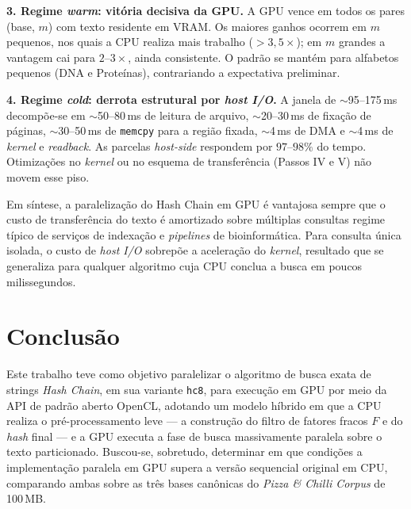 \documentclass[12pt]{article}
\begin{document}
\textbf{3. Regime \textit{warm}: vitória decisiva da GPU.} A GPU vence em todos os pares (base, $m$) com texto residente em VRAM. Os maiores ganhos ocorrem em $m$ pequenos, nos quais a CPU realiza mais trabalho ($>3{,}5\times$); em $m$ grandes a vantagem cai para $2$--$3\times$, ainda consistente. O padrão se mantém para alfabetos pequenos (DNA e Proteínas), contrariando a expectativa preliminar.

\textbf{4. Regime \textit{cold}: derrota estrutural por \textit{host I/O}.} A janela de $\sim$95--175\,ms decompõe-se em $\sim$50--80\,ms de leitura de arquivo, $\sim$20--30\,ms de fixação de páginas, $\sim$30--50\,ms de \texttt{memcpy} para a região fixada, $\sim$4\,ms de DMA e $\sim$4\,ms de \textit{kernel} e \textit{readback}. As parcelas \textit{host-side} respondem por $97$--$98\%$ do tempo. Otimizações no \textit{kernel} ou no esquema de transferência (Passos IV e V) não movem esse piso.

Em síntese, a paralelização do Hash Chain em GPU é vantajosa sempre que o custo de transferência do texto é amortizado sobre múltiplas consultas  regime típico de serviços de indexação e \textit{pipelines} de bioinformática. Para consulta única isolada, o custo de \textit{host I/O} sobrepõe a aceleração do \textit{kernel}, resultado que se generaliza para qualquer algoritmo cuja CPU conclua a busca em poucos milissegundos.

\section{Conclusão}
\label{sec:conclusao}

Este trabalho teve como objetivo paralelizar o algoritmo de busca exata de strings \textit{Hash Chain}, em sua variante \texttt{hc8}, para execução em GPU por meio da API de padrão aberto OpenCL, adotando um modelo híbrido em que a CPU realiza o pré-processamento leve — a construção do filtro de fatores fracos $F$ e do \textit{hash} final — e a GPU executa a fase de busca massivamente paralela sobre o texto particionado. Buscou-se, sobretudo, determinar em que condições a implementação paralela em GPU supera a versão sequencial original em CPU, comparando ambas sobre as três bases canônicas do \textit{Pizza \& Chilli Corpus} de 100\,MB.
\end{document}
